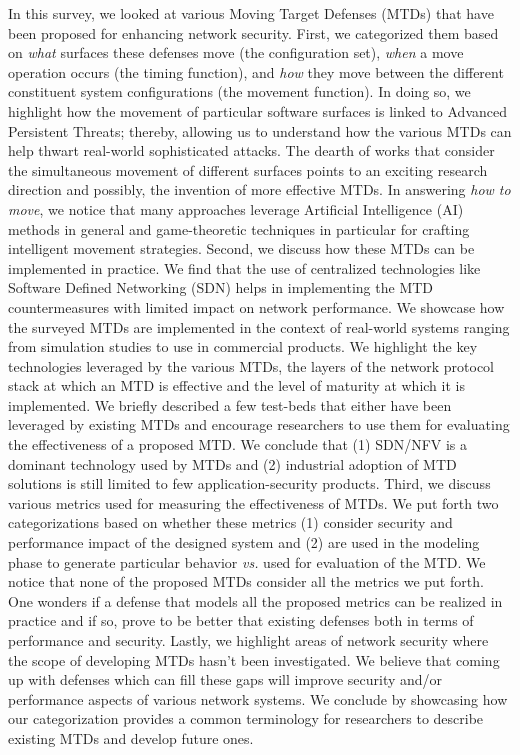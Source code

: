 \label{concl}
In this survey, we looked at various Moving Target Defenses (MTDs) that have been proposed for enhancing network security. First, we categorized them based on {\em what} surfaces these defenses move (the configuration set), {\em when} a move operation occurs (the timing function), and {\em how} they move between the different constituent system configurations (the movement function). In doing so, we highlight how the movement of particular software surfaces is linked to Advanced Persistent Threats; thereby, allowing us to understand how the various MTDs can help thwart real-world sophisticated attacks. The dearth of works that consider the simultaneous movement of different surfaces points to an exciting research direction and possibly, the invention of more effective MTDs. In answering {\em how to move}, we notice that many approaches leverage Artificial Intelligence (AI) methods in general and game-theoretic techniques in particular for crafting intelligent movement strategies.
Second, we discuss how these MTDs can be implemented in practice. We find that the use of centralized technologies like Software Defined Networking (SDN) helps in implementing the MTD countermeasures with limited impact on network performance. We showcase how the surveyed MTDs are implemented in the context of real-world systems ranging from simulation studies to use in commercial products. We highlight the key technologies leveraged by the various MTDs, the layers of the network protocol stack at which an MTD is effective and the level of maturity at which it is implemented. We briefly described a few test-beds that either have been leveraged by existing MTDs and encourage researchers to use them for evaluating the effectiveness of a proposed MTD. We conclude that (1) SDN/NFV is a dominant technology used by MTDs and (2) industrial adoption of MTD solutions is still limited to few application-security products.
Third, we discuss various metrics used for measuring the effectiveness of MTDs. We put forth two categorizations based on whether these metrics (1) consider security and performance impact of the designed system and (2) are used in the modeling phase to generate particular behavior {\em vs.} used for evaluation of the MTD.
We notice that none of the proposed MTDs consider all the metrics we put forth. One wonders if a defense that models all the proposed metrics can be realized in practice and if so, prove to be better that existing defenses both in terms of performance and security.
Lastly, we highlight areas of network security where the scope of developing MTDs hasn't been investigated. We believe that coming up with defenses which can fill these gaps will improve security and/or performance aspects of various network systems. We conclude by showcasing how our categorization provides a common terminology for researchers to describe existing MTDs and develop future ones.

